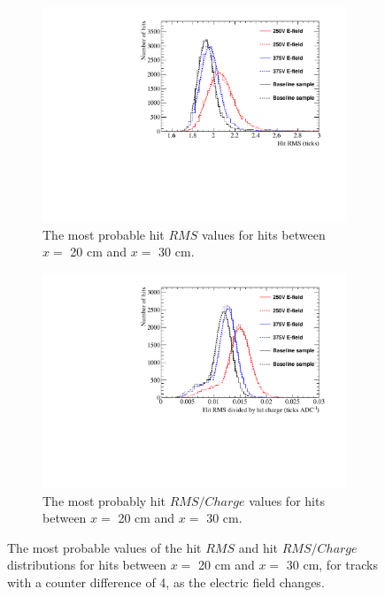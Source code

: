 \begin{figure}
  \centering
  \begin{subfigure}{0.48\textwidth}
    \centering
    \includegraphics[width=\textwidth]{Canvas_RMS_20cm_ElecField}
    \caption{The most probable hit $RMS$ values for hits between $x =$ 20 cm and $x =$ 30 cm.}
  \end{subfigure}%
  \hspace{0.03\textwidth}%
  \begin{subfigure}{0.48\textwidth}
    \centering
    \includegraphics[width=\textwidth]{Canvas_RMS_Q_20cm_ElecField}
    \caption{The most probably hit $RMS/Charge$ values for hits between $x =$ 20 cm and $x =$ 30 cm.}
  \end{subfigure}
  \caption[The most probable values of the hit $RMS$ and hit $RMS/Charge$ distributions for tracks with a counter difference of 4, as the electric field changes]
          {The most probable values of the hit $RMS$ and hit $RMS/Charge$ distributions for hits between $x =$ 20 cm and $x =$ 30 cm, for tracks with a counter difference of 4, as the electric field changes.}
  \label{fig:DiffElecStudy_HitFit}
\end{figure}

